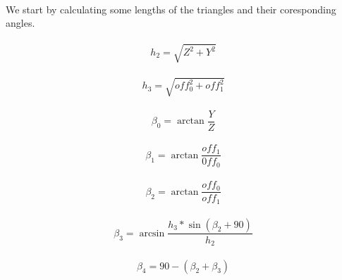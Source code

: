 \documentclass{article}
\begin{document}
    \paragraph{}
    We start by calculating some lengths of the triangles and their coresponding angles.

    \paragraph{}
    \begin{equation}
        h_2 = \sqrt{Z^2 + Y^2}
    \end{equation}

    \paragraph{}
    \begin{equation}
        h_3 = \sqrt{off_0^2 + off_1^2}
    \end{equation}

    \paragraph{}
    \begin{equation}
        \beta_0 = \arctan \frac{Y}{Z}
    \end{equation}

    \paragraph{}
    \begin{equation}
        \beta_1 = \arctan \frac{off_1}{0ff_0}
    \end{equation}

    \paragraph{}
    \begin{equation}
        \beta_2 = \arctan \frac{off_0}{off_1}
    \end{equation}

    \paragraph{}
    \begin{equation}
        \beta_3 = \arcsin \frac{h_3 * \sin(\beta_2 + 90)}{h_2}
    \end{equation}

    \paragraph{}
    \begin{equation}
        \beta_4 = 90 - (\beta_2 + \beta_3)
    \end{equation}
\end{document}
